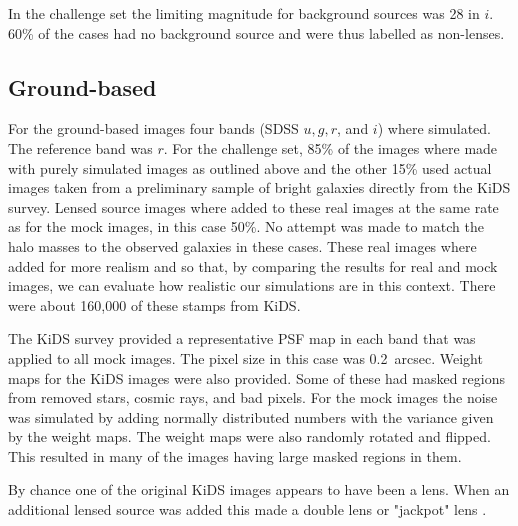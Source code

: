 \documentclass{aa}
\begin{document}
 In the challenge set the limiting magnitude for background sources was 28 in $i$.   60\% of the cases had no background source and were thus labelled as non-lenses.
 
\subsection{Ground-based}
\label{sec:sim-ground-based}

For the ground-based images four bands (SDSS $u,g,r$, and $i$) where simulated.  The reference band was $r$.  For the challenge set, 85\% of the images where made with purely simulated images as outlined above and the other 15\% used actual images taken from a preliminary sample of bright galaxies directly from the KiDS survey.  Lensed source images where added to these real images at the same rate as for the mock images,  in this case 50\%.  No attempt was made to match the halo masses to the observed galaxies in these cases.  These real images where added for more realism and so that, by comparing the results for real and mock images, we can evaluate how realistic our simulations are in this context.  There were about 160,000 of these stamps from KiDS.

The KiDS survey provided a representative PSF map in each band that was applied to all mock images.   The pixel size in this case was 0.2~arcsec. 
Weight maps for the KiDS images were also provided.  Some of these had masked regions from removed stars, cosmic rays, and bad pixels.  For the mock images the noise was simulated by adding normally distributed numbers with the variance given by the weight maps.  The weight maps were also randomly rotated and flipped.  This resulted in many of the images having large masked regions in them.

By chance one of the original KiDS images appears to have been a lens.  When an additional lensed source was added this made a double lens or "jackpot" lens \citep{2008ApJ...677.1046G}.
\end{document}
